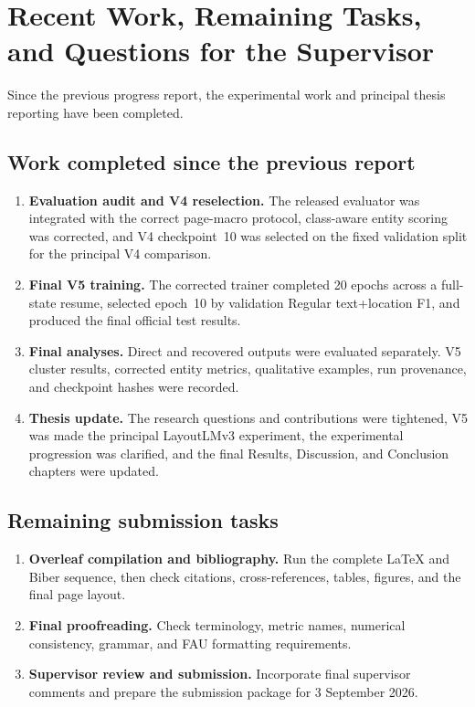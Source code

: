 \documentclass[11pt,a4paper]{article}
\begin{document}
\section{Recent Work, Remaining Tasks, and Questions for the Supervisor}

Since the previous progress report, the experimental work and principal thesis
reporting have been completed.

\subsection*{Work completed since the previous report}
\begin{enumerate}[leftmargin=1.5em]
\item \textbf{Evaluation audit and V4 reselection.}
  The released evaluator was integrated with the correct page-macro protocol,
  class-aware entity scoring was corrected, and V4 checkpoint~10 was selected
  on the fixed validation split for the principal V4 comparison.
\item \textbf{Final V5 training.}
  The corrected trainer completed 20 epochs across a full-state resume, selected
  epoch~10 by validation Regular text+location F1, and produced the final
  official test results.
\item \textbf{Final analyses.}
  Direct and recovered outputs were evaluated separately. V5 cluster results,
  corrected entity metrics, qualitative examples, run provenance, and
  checkpoint hashes were recorded.
\item \textbf{Thesis update.}
  The research questions and contributions were tightened, V5 was made the
  principal LayoutLMv3 experiment, the experimental progression was clarified,
  and the final Results, Discussion, and Conclusion chapters were updated.
\end{enumerate}

\subsection*{Remaining submission tasks}
\begin{enumerate}[leftmargin=1.5em]
\item \textbf{Overleaf compilation and bibliography.}
  Run the complete LaTeX and Biber sequence, then check citations,
  cross-references, tables, figures, and the final page layout.
\item \textbf{Final proofreading.}
  Check terminology, metric names, numerical consistency, grammar, and FAU
  formatting requirements.
\item \textbf{Supervisor review and submission.}
  Incorporate final supervisor comments and prepare the submission package for
  3 September 2026.
\end{enumerate}
\end{document}
